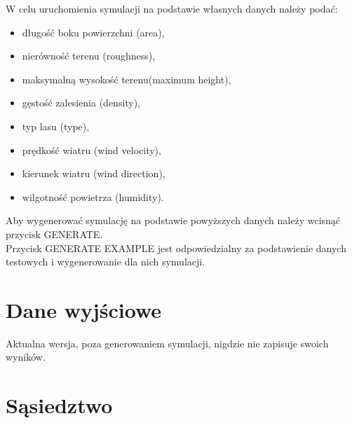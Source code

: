 \documentclass[a4paper, 11pt]{article}
\begin{document}
	\hfill%
	\begin{minipage}{0.5\textwidth}\raggedright
		
		W celu uruchomienia symulacji na podstawie własnych danych należy podać:
		\begin{itemize}
			\item długość boku powierzchni (area),
			\item nierówność terenu (roughness),
			\item maksymalną wysokość terenu(maximum height),
			\item gęstość zalesienia (density),
			\item typ lasu (type),
			\item prędkość wiatru (wind velocity),
			\item kierunek wiatru (wind direction),
			\item wilgotność powietrza (humidity).
		\end{itemize}
		Aby wygenerować symulację na podstawie powyższych danych należy wcisnąć przycisk GENERATE.\\
		Przycisk GENERATE EXAMPLE jest odpowiedzialny za podstawienie danych testowych i wygenerowanie dla nich symulacji.
	\end{minipage}
	
	
	\section*{Dane wyjściowe}
	\indent
	
	Aktualna wersja, poza generowaniem symulacji, nigdzie nie zapisuje swoich wyników.
	
	\section*{Sąsiedztwo}
	\indent	
	
\end{document}
